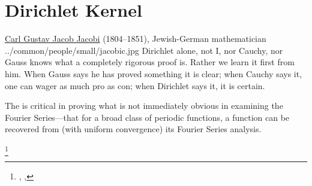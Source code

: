 \section{Dirichlet Kernel}
\qboxnpq
  {
    \href{http://en.wikipedia.org/wiki/Carl_Gustav_Jakob_Jacobi}{Carl Gustav Jacob Jacobi}
    (1804--1851), Jewish-German mathematician
    \footnotemark
  }
  {../common/people/small/jacobic.jpg}
  {Dirichlet alone, not I, nor Cauchy, nor Gauss knows what a completely rigorous proof is.
   Rather we learn it first from him.
   When Gauss says he has proved something it is clear;
   when Cauchy says it, one can wager as much pro as con;
   when Dirichlet says it, it is certain.}

The  is critical in proving what is not immediately obvious 
in examining the Fourier Series---that for a broad class of periodic functions,
a function can be recovered from (with uniform convergence)
its Fourier Series analysis.
\begin{definition}
\label{def:dkernel}
\label{def:Dn}
\footnote{
  ,
  ,
  }
\end{definition}


